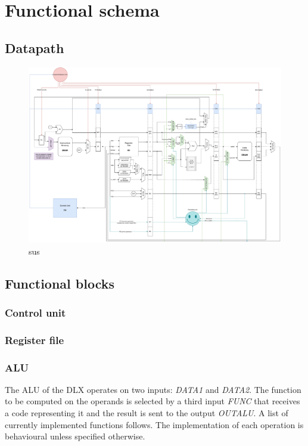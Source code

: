 \chapter{Functional schema}

\section{Datapath}

\begin{figure}[ht]
	\centering
	\includegraphics[width=\textwidth]{chapters/figures/datapath.pdf} 
	\caption{sus}
	\label{fig:datapath}
\end{figure}


\section{Functional blocks}
\subsection{Control unit}
\subsection{Register file}
\subsection{ALU}
The ALU of the DLX operates on two inputs: \emph{DATA1} and \emph{DATA2}.
The function to be computed on the operands is selected by a third input \emph{FUNC} that receives a code representing it and the result is sent to the output \emph{OUTALU}. A list of currently implemented functions follows. The implementation of each operation is behavioural unless specified otherwise. 

